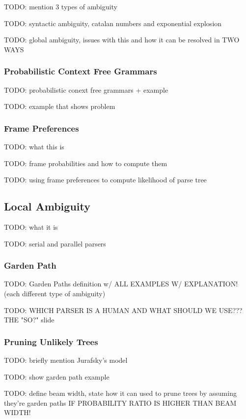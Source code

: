 \documentclass{article}
\begin{document}
TODO: mention 3 types of ambiguity

TODO: syntactic ambiguity, catalan numbers and exponential explosion

TODO: global ambiguity, issues with this and how it can be resolved in TWO WAYS

\subsubsection{Probabilistic Context Free Grammars}

TODO: probabilistic conext free grammars + example

TODO: example that shows problem

\subsubsection{Frame Preferences}

TODO: what this is

TODO: frame probabilities and how to compute them

TODO: using frame preferences to compute likelihood of parse tree

\subsection{Local Ambiguity}

TODO: what it is

TODO: serial and parallel parsers

\subsubsection{Garden Path}

TODO: Garden Paths definition w/ ALL EXAMPLES W/ EXPLANATION!
	(each different type of ambiguity)

TODO: WHICH PARSER IS A HUMAN AND WHAT SHOULD WE USE??? THE "SO?" slide

\subsubsection{Pruning Unlikely Trees}

TODO: briefly mention Jurafsky's model

TODO: show garden path example

TODO: define beam width, state how it can used to prune trees by assuming they're garden paths IF PROBABILITY RATIO IS HIGHER THAN BEAM WIDTH!
\end{document}
